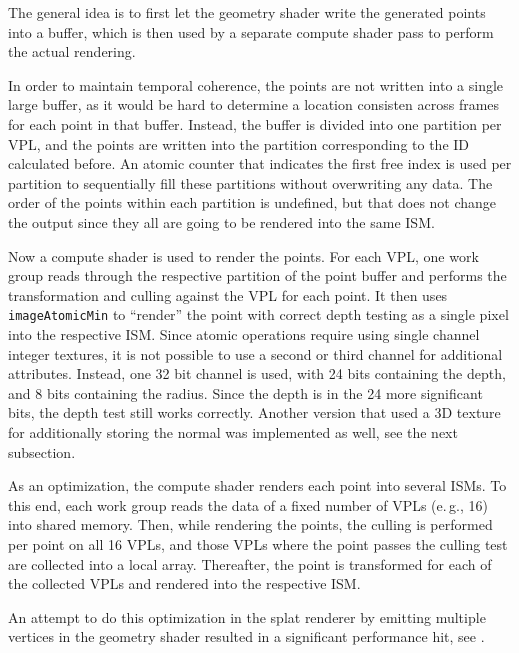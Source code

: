 The general idea is to first let the geometry shader write the generated points into a buffer, which is then used by a separate compute shader pass to perform the actual rendering.

In order to maintain temporal coherence, the points are not written into a single large buffer, as it would be hard to determine a location consisten across frames for each point in that buffer. Instead, the buffer is divided into one partition per VPL, and the points are written into the partition corresponding to the ID calculated before. An atomic counter that indicates the first free index is used per partition to sequentially fill these partitions without overwriting any data. The order of the points within each partition is undefined, but that does not change the output since they all are going to be rendered into the same ISM.

Now a compute shader is used to render the points. For each VPL, one work group reads through the respective partition of the point buffer and performs the transformation and culling against the VPL for each point. It then uses \texttt{imageAtomicMin} to ``render'' the point with correct depth testing as a single pixel into the respective ISM. Since atomic operations require using single channel integer textures, it is not possible to use a second or third channel for additional attributes. Instead, one 32 bit channel is used, with 24 bits containing the depth, and 8 bits containing the radius. Since the depth is in the 24 more significant bits, the depth test still works correctly. Another version that used a 3D texture for additionally storing the normal was implemented as well, see the next subsection.

As an optimization, the compute shader renders each point into several ISMs. To this end, each work group reads the data of a fixed number of VPLs (e.\,g., 16) into shared memory. Then, while rendering the points, the culling is performed per point on all 16 VPLs, and those VPLs where the point passes the culling test are collected into a local array. Thereafter, the point is transformed for each of the collected VPLs and rendered into the respective ISM.


An attempt to do this optimization in the splat renderer by emitting multiple vertices in the geometry shader resulted in a significant performance hit, see .


